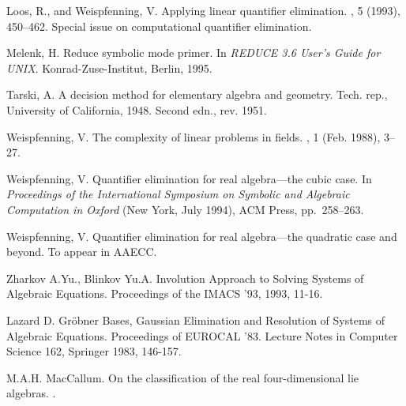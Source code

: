 \begin{thebibliography}{999}
{Loos, R., and Weispfenning, V.}
\newblock Applying linear quantifier elimination.
, 5 (1993), 450--462.
\newblock Special issue on computational quantifier elimination.

{Melenk, H.}
\newblock Reduce symbolic mode primer.
\newblock In {\em REDUCE 3.6 User's Guide for UNIX}. Konrad-Zuse-Institut,
  Berlin, 1995.

{Tarski, A.}
\newblock A decision method for elementary algebra and geometry.
\newblock Tech. rep., University of California, 1948.
\newblock Second edn., rev. 1951.

{Weispfenning, V.}
\newblock The complexity of linear problems in fields.
, 1 (Feb. 1988), 3--27.


{Weispfenning, V.}
\newblock Quantifier elimination for real algebra---the cubic case.
\newblock In {\em Proceedings of the International Symposium on Symbolic and
  Algebraic Computation in Oxford\/} (New York, July 1994), ACM Press,
  pp.~258--263.

{Weispfenning, V.}
\newblock Quantifier elimination for real algebra---the quadratic case and
  beyond.
\newblock To appear in AAECC.


Zharkov A.Yu., Blinkov Yu.A. Involution Approach to Solving Systems
of Algebraic Equations. Proceedings of the IMACS '93, 1993, 11-16.


Lazard D. Gr\"obner Bases, Gaussian Elimination and Resolution of
Systems of Algebraic Equations. Proceedings of EUROCAL '83.
Lecture Notes in Computer Science 162, Springer 1983, 146-157.


M.A.H. MacCallum.
\newblock On the classification of the real four-dimensional lie algebras.
.


\end{thebibliography}
